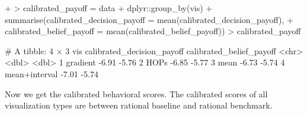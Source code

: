 \documentclass{article}
\begin{document}
\begin{Schunk}
\begin{Sinput}
{+ }
> calibrated_payoff = data %>%
+   dplyr::group_by(vis) %>%
+   summarise(calibrated_decision_payoff = mean(calibrated_decision_payoff),
+             calibrated_belief_payoff = mean(calibrated_belief_payoff))
> calibrated_payoff
\end{Sinput}
\begin{Soutput}
# A tibble: 4 × 3
  vis           calibrated_decision_payoff calibrated_belief_payoff
  <chr>                              <dbl>                    <dbl>
1 gradient                           -6.91                    -5.76
2 HOPs                               -6.85                    -5.77
3 mean                               -6.73                    -5.74
4 mean+interval                      -7.01                    -5.74
\end{Soutput}
\end{Schunk}

Now we get the calibrated behavioral scores. The calibrated scores of all visualization types are between rational baseline and rational benchmark.
\end{document}
